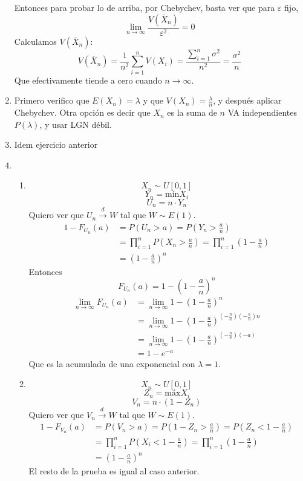\begin{enumerate}
		Entonces para probar lo de arriba, por Chebychev, basta ver que para $\varepsilon$ fijo,
		$$\lim_{n\rightarrow\infty}\frac{V(\overline X_n)}{\varepsilon^2} = 0$$
		Calculamos $V(\overline X_n)$:
		$$V(\overline X_n) = \frac{1}{n^2} \sum_{i=1}^n V(X_i) = \frac{\sum_{i=1}^n \sigma^2}{n^2} = \frac{\sigma^2}{n}$$
		Que efectivamente tiende a cero cuando $n\rightarrow\infty$.
	\item
		Primero verifico que $E(X_n) = \lambda$ y que $V(X_n) = \frac{\lambda}{n}$, y después aplicar Chebychev.
		Otra opción es decir que $X_n$ es la suma de $n$ VA independientes $P(\lambda)$, y usar LGN débil.
	\item
		Idem ejercicio anterior
	\item
		\begin{enumerate}
			\item
				$$X_n \sim U[0,1]$$
				$$Y_n = \text{mín}X_i$$
				$$U_n = n\cdot Y_n$$
				Quiero ver que $U_n \xrightarrow{d}W$ tal que $W\sim E(1)$.
				\begin{align*}
					1 - F_{U_n}(a)	& = P(U_n > a) = P\left(Y_n > \frac{a}{n}\right)	\\
									& = \prod_{i=1}^n P\left(X_n > \frac{a}{n}\right) = \prod_{i=1}^n \left(1 - \frac{a}{n}\right)	\\
									& = \left(1 - \frac{a}{n}\right)^n
				\end{align*}
				Entonces $$F_{U_n}(a) = 1 - \left(1 - \frac{a}{n}\right)^n$$
				\begin{align*}
					\lim_{n\rightarrow\infty}F_{U_n}(a)	& = \lim_{n\rightarrow\infty}1 - \left(1 - \frac{a}{n}\right)^n	\\
														& = \lim_{n\rightarrow\infty}1 - \left(1 - \frac{a}{n}\right)^{\left(-\frac{n}{a}\right)\left(-\frac{a}{n}\right)n}	\\
														& = \lim_{n\rightarrow\infty}1 - \left(1 - \frac{a}{n}\right)^{\left(-\frac{n}{a}\right)(-a)}	\\
														& = 1-e^{-a}
				\end{align*}
				Que es la acumulada de una exponencial con $\lambda=1$.
			\item
				$$X_n \sim U[0,1]$$
				$$Z_n = \text{máx}X_i$$
				$$V_n = n\cdot (1-Z_n)$$
				Quiero ver que $V_n \xrightarrow{d}W$ tal que $W\sim E(1)$.
				\begin{align*}
					1 - F_{V_n}(a)	& = P(V_n > a) = P\left(1-Z_n > \frac{a}{n}\right) = P\left(Z_n < 1 - \frac{a}{n}\right)			\\
									& = \prod_{i=1}^n P\left(X_i < 1 - \frac{a}{n}\right) =  \prod_{i=1}^n \left(1-\frac{a}{n}\right)	\\
									& = \left(1-\frac{a}{n}\right)^n
				\end{align*}
				El resto de la prueba es igual al caso anterior.
		\end{enumerate}
\end{enumerate}
